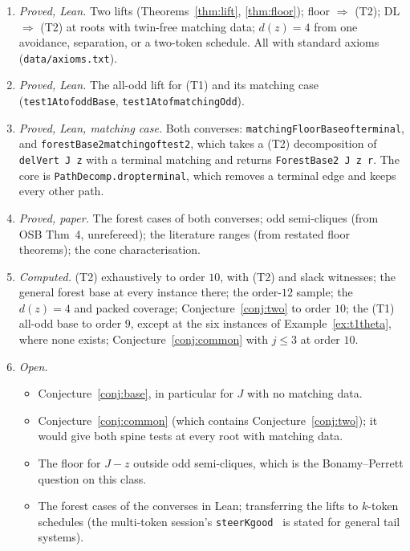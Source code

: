 \documentclass[11pt]{amsart}
\theoremstyle{definition}
\theoremstyle{remark}
\renewcommand{\_}{\oldunderscore\allowbreak}
\begin{document}
\begin{enumerate}[leftmargin=*]
\item \emph{Proved, Lean.} Two lifts (Theorems~\ref{thm:lift}, \ref{thm:floor}); floor $\Rightarrow$
(T2); DL $\Rightarrow$ (T2) at roots with twin-free matching data; $d(z)=4$ from one avoidance,
separation, or a two-token schedule. All with standard axioms (\texttt{data/axioms.txt}).
\item \emph{Proved, Lean.} The all-odd lift for (T1) and its matching case
(\texttt{test1At\_of\_oddBase}, \texttt{test1At\_of\_matchingOdd}).
\item \emph{Proved, Lean, matching case.} Both converses: \texttt{matchingFloorBase\_of\_terminal}, and
\texttt{forestBase2\_matching\_of\_test2}, which takes a (T2) decomposition of \texttt{delVert J z} with a
terminal matching and returns \texttt{ForestBase2 J z r}. The core is \texttt{PathDecomp.drop\_terminal},
which removes a terminal edge and keeps every other path.
\item \emph{Proved, paper.} The forest cases of both converses; odd semi-cliques (from OSB Thm~4,
unrefereed); the literature ranges (from restated floor theorems); the cone characterisation.
\item \emph{Computed.} (T2) exhaustively to order $10$, with (T2) and slack witnesses; the general
forest base at every instance there;
the order-$12$ sample; the $d(z)=4$ and packed coverage; Conjecture~\ref{conj:two} to order $10$;
the (T1) all-odd base to order $9$, except at the six instances of Example~\ref{ex:t1theta}, where
none exists; Conjecture~\ref{conj:common} with $j\le3$ at order $10$.
\item \emph{Open.}
\begin{itemize}
\item Conjecture~\ref{conj:base}, in particular for $J$ with no matching data.
\item Conjecture~\ref{conj:common} (which contains Conjecture~\ref{conj:two}); it would give both
spine tests at every root with matching data.
\item The floor for $J-z$ outside odd semi-cliques, which is the Bonamy--Perrett question on this class.
\item The forest cases of the converses in Lean; transferring the lifts to $k$-token schedules
(the multi-token session's \texttt{steerK\_good}~\cite{MT} is stated for general tail systems).
\end{itemize}
\end{enumerate}
\end{document}
